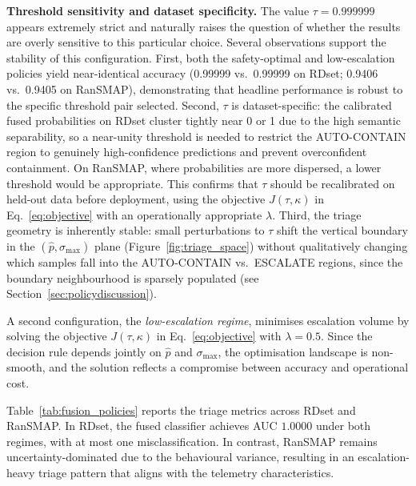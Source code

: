 \documentclass[3p]{elsarticle}
\begin{document}
\noindent\textbf{Threshold sensitivity and dataset specificity.}
The value $\tau = 0.999999$ appears extremely strict and naturally raises the question of
whether the results are overly sensitive to this particular choice. Several observations
support the stability of this configuration. First, both the safety-optimal and
low-escalation policies yield near-identical accuracy (0.99999 vs.\ 0.99999 on RDset;
0.9406 vs.\ 0.9405 on RanSMAP), demonstrating that headline performance is robust to the
specific threshold pair selected. Second, $\tau$ is dataset-specific: the calibrated fused
probabilities on RDset cluster tightly near 0 or 1 due to the high semantic separability,
so a near-unity threshold is needed to restrict the AUTO-CONTAIN region to genuinely
high-confidence predictions and prevent overconfident containment. On RanSMAP, where
probabilities are more dispersed, a lower threshold would be appropriate. This confirms
that $\tau$ should be recalibrated on held-out data before deployment, using the objective
$J(\tau,\kappa)$ in Eq.~\eqref{eq:objective} with an operationally appropriate $\lambda$.
Third, the triage geometry is inherently stable: small perturbations to $\tau$ shift the
vertical boundary in the $(\hat{p}, \sigma_{\max})$ plane (Figure~\ref{fig:triage_space})
without qualitatively changing which samples fall into the AUTO-CONTAIN vs.\ ESCALATE
regions, since the boundary neighbourhood is sparsely populated (see Section~\ref{sec:policydiscussion}).

A second configuration, the \emph{low-escalation regime}, minimises escalation volume by
solving the objective $J(\tau,\kappa)$ in Eq.~\eqref{eq:objective} with \(\lambda = 0.5\).
Since the decision rule depends jointly on \(\hat{p}\) and \(\sigma_{\max}\), the optimisation
landscape is non-smooth, and the solution reflects a compromise between accuracy and operational
cost.

Table~\ref{tab:fusion_policies} reports the triage metrics across RDset and RanSMAP. In RDset, the fused classifier achieves AUC \(1.0000\) under both regimes, with at most one misclassification. In contrast, RanSMAP remains uncertainty-dominated due to the behavioural variance, resulting in an escalation-heavy triage pattern that aligns with the telemetry characteristics.
\end{document}

